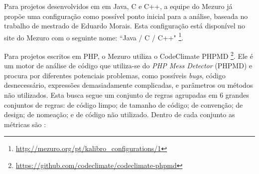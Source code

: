 
Para projetos desenvolvidos em em Java, C e C++, a equipe do Mezuro já propõe
uma configuração como possível ponto inicial para a análise, baseada no trabalho
de mestrado de Eduardo Morais. Esta configuração está disponível no site do
Mezuro com o seguinte nome: ``Java / C / C++"
\footnote{\url{http://mezuro.org/pt/kalibro_configurations/1}}.

Para projetos escritos em PHP, o Mezuro utiliza o CodeClimate PHPMD
\footnote{\url{https://github.com/codeclimate/codeclimate-phpmd}}.
Ele é um motor de análise de código que utiliza-se do \textit{PHP Mess Detector}
(PHPMD) e procura por diferentes potenciais problemas, como possíveis \textit{bugs},
código desnecessário, expressões demasiadamente complicadas, e parâmetros ou
métodos não utilizados. Esta busca segue um conjunto de regras agrupadas em 6
grandes conjuntos de regras: de código limpo; de tamanho de código; de
convenção; de design; de nomeação; e de código não utilizado. Dentro de cada
conjunto as métricas são \cite{PichlerPHPMD}:

